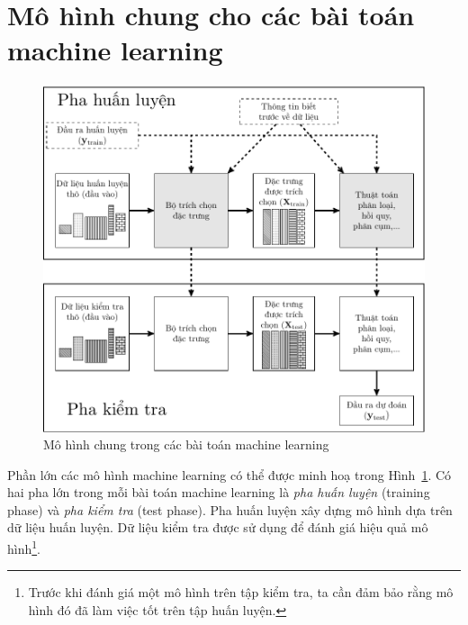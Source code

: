\section{Mô hình chung cho các bài toán machine learning }
\begin{figure}[t]
\centering
\includegraphics[width = \textwidth]{Chapters/01_Overview/11_featureengineering/latex/ML_models2.pdf}
\caption[]{Mô hình chung trong các bài toán machine learning}
\label{fig:11_1}
\end{figure}



Phần lớn các mô hình machine learning có thể được minh hoạ trong
Hình~\ref{fig:11_1}. Có hai pha lớn trong mỗi bài toán machine learning là
\textit{pha huấn luyện} (training phase) và \textit{pha kiểm tra} (test phase). Pha huấn luyện xây dựng mô
hình dựa trên dữ liệu huấn luyện. Dữ liệu kiểm tra được sử dụng để đánh giá
hiệu quả mô hình\footnote{Trước khi đánh giá một mô hình trên tập kiểm tra, ta
cần đảm bảo rằng mô hình đó đã làm việc tốt trên tập huấn luyện.}.

